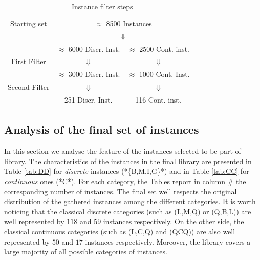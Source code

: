 \begin{enumerate}
\begin{center}
\begin{table}[]
 \centering
 \setlength{\tabcolsep}{5pt}
\begin{tabular}{cccc}
Starting set& \multicolumn{ 2}{c}{ $\approx$ 8500 Instances }& \\
& \multicolumn{ 2}{c}{$\Downarrow$}& \\
& $\approx$ 6000 Discr. Inst.  & $\approx$ 2500 Cont. inst. & \\
First Filter  & $\Downarrow$  & $\Downarrow$ & \\
 & $\approx$ 3000 Discr. Inst.  & $\approx$ 1000 Cont. Inst. & \\
Second Filter & $\Downarrow$  & $\Downarrow$  & \\
  & 251 Discr. Inst.  & 116  Cont. inst. & \\
\end{tabular}
\caption{Instance filter steps} \label{tab:filters}
\end{table}
\end{center}

\subsection{Analysis of the final set of instances}\label{subsec:final set}

In this section we analyse the feature of the instances selected to be
part of library.
The characteristics of the instances in the final library are
presented in Table \ref{tab:DD} for \emph{discrete} instances
(*\{B,M,I,G\}*) and in Table \ref{tab:CC} for
\emph{continuous} ones (*C*).
For each category, the Tables report in column $\#$ the corresponding
number of instances.
The final set well respects the original distribution of the gathered
instances among the different categories.
It is worth noticing that the classical discrete categories (such as
(L,M,Q) or (Q,B,L)) are well represented by $118$ and $59$  instances
respectively. On the other side, the classical continuous categories
(such as (L,C,Q) and (QCQ)) are also well represented by $50$ and $17$
 instances respectively.
Moreover, the library covers a large majority of all possible
categories of instances.



\end{enumerate}
